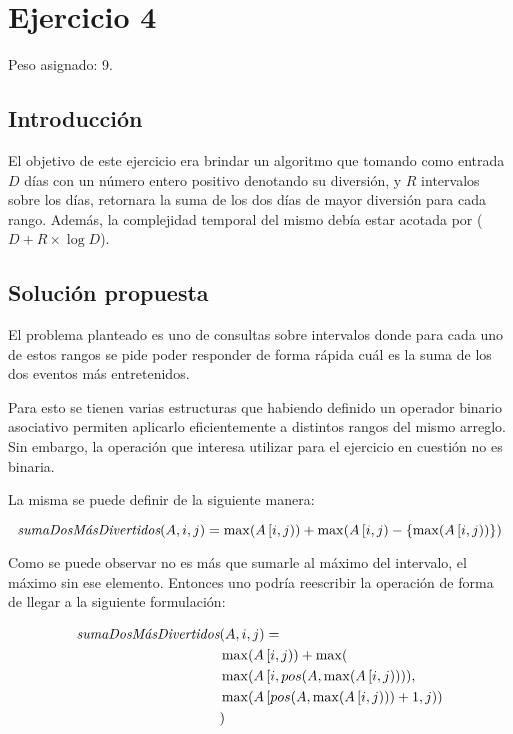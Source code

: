 \section{Ejercicio 4}

Peso asignado: 9.

\subsection{Introducción}

El objetivo de este ejercicio era brindar un algoritmo que tomando como entrada
$D$ días con un número entero positivo denotando su diversión, y $R$ intervalos
sobre los días, retornara la suma de los dos días de mayor diversión para cada
rango. Además, la complejidad temporal del mismo debía estar acotada por
\ord($D + R \times \log{D}$).

\subsection{Solución propuesta}

El problema planteado es uno de consultas sobre intervalos donde para cada uno
de estos rangos se pide poder responder de forma rápida cuál es la suma de los
dos eventos más entretenidos.

Para esto se tienen varias estructuras que habiendo definido un operador binario
asociativo permiten aplicarlo eficientemente a distintos rangos del mismo
arreglo. Sin embargo, la operación que interesa utilizar para el ejercicio en
cuestión no es binaria.

La misma se puede definir de la siguiente manera:

\begin{equation*}
	\emph{sumaDosMásDivertidos}(A, i, j) = \max(A\left[i, j\right)) +
	\max(A\left[i, j\right) - \left\{\max(A\left[i, j\right))\right\})
\end{equation*}

Como se puede observar no es más que sumarle al máximo del intervalo, el máximo
sin ese elemento. Entonces uno podría reescribir la operación de forma de llegar
a la siguiente formulación:

\begin{align*}
	\emph{sumaDosMásDivertidos} & (A, i, j) = \\
	& \max(A\left[i, j\right)) + \max( \\
	& \max(A\left[i, pos(A, \max(A\left[i, j\right))\right)), \\
	& \max(A\left[pos(A, \max(A\left[i, j\right))) + 1, j\right)) \\
	& )
\end{align*}

